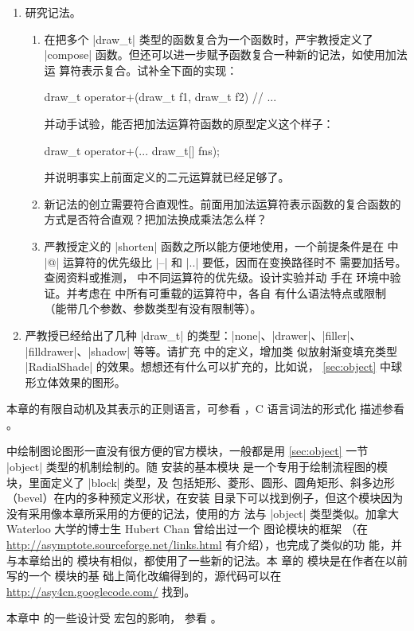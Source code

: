 \begin{enumerate}
  \item 研究记法。
    \begin{enumerate}
      \item 在把多个 |draw_t| 类型的函数复合为一个函数时，严宇教授定义了
        |compose| 函数。但还可以进一步赋予函数复合一种新的记法，如使用加法运
        算符表示复合。试补全下面的实现：
\begin{asycode}
draw_t operator+(draw_t f1, draw_t f2)
{
    // ...
}
\end{asycode}
        并动手试验，能否把加法运算符函数的原型定义这个样子：
\begingroup
\renewcommand\thelstnumber{?}
\begin{asycode}[numbers=left]
draw_t operator+(... draw_t[] fns);
\end{asycode}
\endgroup
        并说明事实上前面定义的二元运算就已经足够了。

      \item 新记法的创立需要符合直观性。前面用加法运算符表示函数的复合函数的
        方式是否符合直观？把加法换成乘法怎么样？

      \item 严教授定义的 |shorten| 函数之所以能方便地使用，一个前提条件是在
        \Asy{} 中 |@| 运算符的优先级比 |--| 和 |..| 要低，因而在变换路径时不
        需要加括号。查阅资料或推测，\Asy{} 中不同运算符的优先级。设计实验并动
        手在 \Asy{} 环境中验证。并考虑在 \Asy{} 中所有可重载的运算符中，各自
        有什么语法特点或限制（能带几个参数、参数类型有没有限制等）。
    \end{enumerate}%

  \item 严教授已经给出了几种 |draw_t| 的类型：|none|、|drawer|、|filler|、
    |filldrawer|、|shadow| 等等。请扩充  中的定义，增加类
    似放射渐变填充类型 |RadialShade| 的效果。想想还有什么可以扩充的，比如说，
    \autoref{sec:object} 中球形立体效果的图形。

\end{enumerate}

本章的有限自动机及其表示的正则语言，可参看 \cite{aho1974}，C 语言词法的形式化
描述参看 \cite{harbison2002}。

\Asy{} 中绘制图论图形一直没有很方便的官方模块，一般都是用
\autoref{sec:object} 一节 |object| 类型的机制绘制的。随 \Asy{} 安装的基本模块
 是一个专用于绘制流程图的模块，里面定义了 |block| 类型，及
包括矩形、菱形、圆形、圆角矩形、斜多边形（bevel）在内的多种预定义形状，在安装
目录下可以找到例子，但这个模块因为没有采用像本章所采用的方便的记法，使用的方
法与 |object| 类型类似。加拿大 Waterloo 大学的博士生 Hubert Chan 曾给出过一个
图论模块的框架 （在
\url{http://asymptote.sourceforge.net/links.html} 有介绍），也完成了类似的功
能，并与本章给出的  模块有相似，都使用了一些新的记法。本
章的  模块是在作者在以前写的一个  模块的基
础上简化改编得到的，源代码可以在 \url{http://asy4cn.googlecode.com/} 找到。

本章中  的一些设计受  宏包的影响，
参看 \cite{pgfman}。


\endinput



